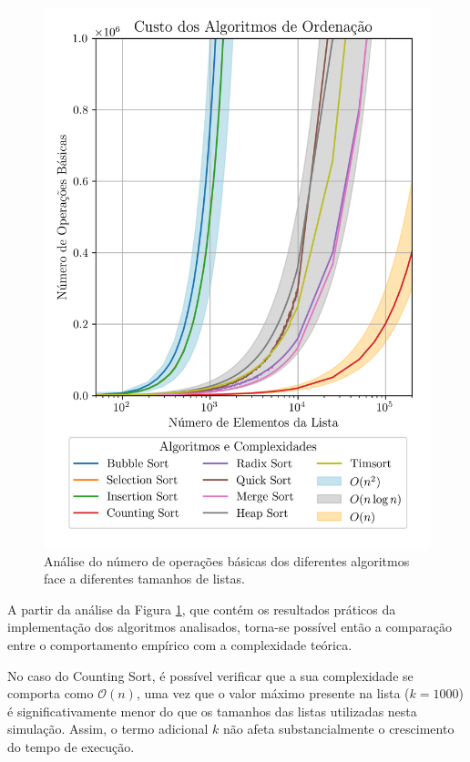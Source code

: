 \documentclass[conference]{IEEEtran}
\begin{document}
\begin{figure}[H]
    \centering
    \includegraphics[width=1\linewidth]{sorting_complexities.png}
    \caption{Análise do número de operações básicas dos diferentes algoritmos face a diferentes tamanhos de listas.}
    \label{fig:sorting_complexities}
\end{figure}

A partir da análise da Figura \ref{fig:sorting_complexities}, que contém os resultados práticos da implementação dos algoritmos analisados, torna-se possível então a comparação entre o comportamento empírico com a complexidade teórica.

No caso do Counting Sort, é possível verificar que a sua complexidade se comporta como \( \mathcal{O}(n) \), uma vez que o valor máximo presente na lista (\( k = 1000 \)) é significativamente menor do que os tamanhos das listas utilizadas nesta simulação. Assim, o termo adicional \( k \) não afeta substancialmente o crescimento do tempo de execução.
\end{document}
